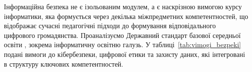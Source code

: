 
Інформаційна безпека не є ізольованим модулем, а є наскрізною вимогою курсу інформатики, яка формується через декілька міжпредметних компетентностей, що відображає сучасні педагогічні підходи до формування відповідального цифрового громадянства. Проаналізуємо Державний стандарт базової середньої освіти \cite{KMU_898_2020}, зокрема  інформатичну освітню галузь.  У таблиці~\ref{tab:vimogi_bezpeki} подані вимоги до кібербезпеки, цифрової етики та захисту даних, які інтегровані в структуру ключових компетентностей.

